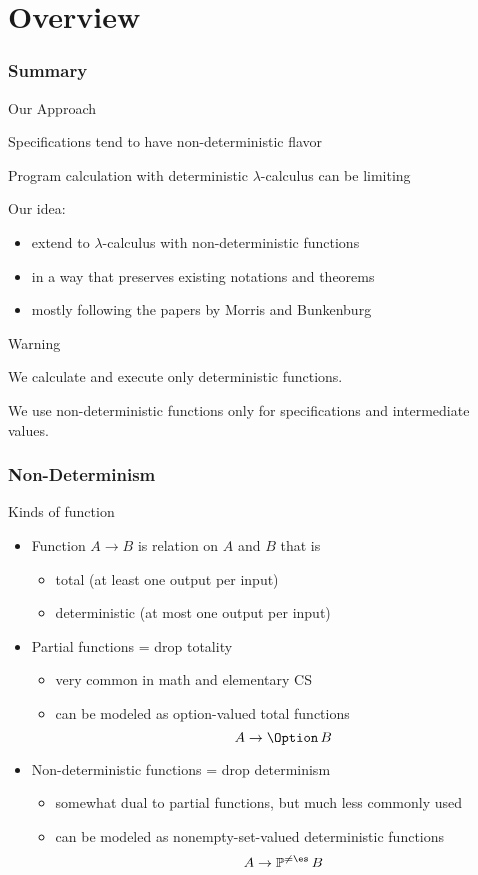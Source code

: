 \documentclass{beamer}
\def\pwr{\mathbb{P}}
\def\PP#1{\pwr^{\neq\es}#1}
\begin{document}
\section{Overview}

\begin{frame}\frametitle{Summary}
\begin{blockitems}{Our Approach}
\item Specifications tend to have non-deterministic flavor
\item Program calculation with deterministic $\lambda$-calculus can be limiting
\item Our idea: 
 \begin{itemize}
 \item extend to $\lambda$-calculus with non-deterministic functions
 \item in a way that preserves existing notations and theorems
 \item mostly following the papers by Morris and Bunkenburg
 \end{itemize}
\end{blockitems}

\begin{blockitems}{Warning}
 \item We calculate and execute only deterministic functions.
 \item We use non-deterministic functions only for specifications and intermediate values.
\end{blockitems}
\end{frame}

\begin{frame}\frametitle{Non-Determinism}
Kinds of function
\begin{itemize}
\item Function $A\to B$ is relation on $A$ and $B$ that is
 \begin{itemize}
 \item total (at least one output per input)
 \item deterministic (at most one output per input)
 \end{itemize}
\item Partial functions = drop totality
 \begin{itemize}
 \item very common in math and elementary CS
 \item can be modeled as option-valued total functions \[A\to \Option\,B\]
 \end{itemize}
\item Non-deterministic functions = drop determinism
 \begin{itemize}
 \item somewhat dual to partial functions, but much less commonly used
 \item can be modeled as nonempty-set-valued deterministic functions \[A\to \PP\, B\]
 \end{itemize}
\end{itemize}
\end{frame}
\end{document}
